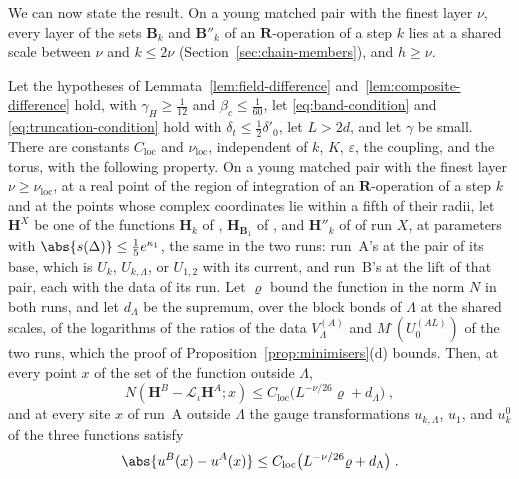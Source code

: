 We can now state the result. On a young matched pair with the finest layer $\nu$, every layer of the sets $\mathbf B_k$ and $\mathbf B''_k$ of an $\mathbf R$-operation of a step $k$ lies at a shared scale between $\nu$ and $k \leq 2\nu$ (Section~\ref{sec:chain-members}), and $h \geq \nu$.

\begin{proposition}\label{prop:localisation-functions}
Let the hypotheses of Lemmata~\ref{lem:field-difference} and~\ref{lem:composite-difference} hold, with $\gamma_H \geq \frac{1}{12}$ and $\beta_c \leq \frac{1}{60}$, let \eqref{eq:band-condition} and \eqref{eq:truncation-condition} hold with $\delta_t \leq \frac{1}{2}\delta'_0$, let $L > 2d$, and let $\gamma$ be small. There are constants $C_{\mathrm{loc}}$ and $\nu_{\mathrm{loc}}$, independent of $k$, $K$, $\varepsilon$, the coupling, and the torus, with the following property. On a young matched pair with the finest layer $\nu \geq \nu_{\mathrm{loc}}$, at a real point of the region of integration of an $\mathbf R$-operation of a step $k$ and at the points whose complex coordinates lie within a fifth of their radii, let $\mathbf H^X$ be one of the functions $\mathbf H_k$ of \cite[(1.63), (1.64)]{BalabanLFR2}, $\mathbf H_{\mathbf B_1}$ of \cite[(1.62)]{BalabanLFR2}, and $\mathbf H''_k$ of \cite[(1.61)]{BalabanLFR2} of run $X$, at parameters with $\abs{s(\Delta)} \leq \frac{1}{5}e^{\kappa_1}$, the same in the two runs: run~A's at the pair of its base, which is $U_k$, $U_{k,\Lambda}$, or $U_{1,2}$ with its current, and run~B's at the lift of that pair, each with the data of its run. Let $\varrho$ bound the function in the norm $N$ in both runs, and let $d_\Lambda$ be the supremum, over the block bonds of $\Lambda$ at the shared scales, of the logarithms of the ratios of the data $V^{(A)}_\Lambda$ and $M^\cdot(U^{(AL)}_0)$ of the two runs, which the proof of Proposition~\ref{prop:minimisers}(d) bounds. Then, at every point $x$ of the set of the function outside $\Lambda$,
\begin{equation}\label{eq:localisation-functions}
    N(\mathbf H^B - \mathcal L_\iota\mathbf H^A; x) \leq C_{\mathrm{loc}}\bigl(L^{-\nu/26}\varrho + d_\Lambda\bigr)\;,
\end{equation}
and at every site $x$ of run~A outside $\Lambda$ the gauge transformations $u_{k,\Lambda}$, $u_1$, and $u^0_k$ of the three functions satisfy
\begin{equation}\label{eq:localisation-gauge}
    \abs{u^B(x) - u^A(x)} \leq C_{\mathrm{loc}}\bigl(L^{-\nu/26}\varrho + d_\Lambda\bigr)\;.
\end{equation}
\end{proposition}


